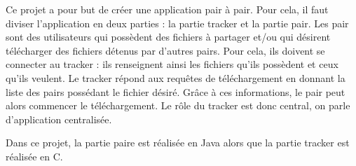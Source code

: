 
Ce projet a pour but de créer une application pair à pair. Pour cela,
il faut diviser l'application en deux parties : la partie tracker et
la partie pair.  Les pair sont des utilisateurs qui possèdent des
fichiers à partager et/ou qui désirent télécharger des fichiers
détenus par d'autres pairs. Pour cela, ils doivent se connecter au
tracker : ils renseignent ainsi les fichiers qu'ils possèdent et ceux
qu'ils veulent. Le tracker répond aux requêtes de téléchargement en
donnant la liste des pairs possédant le fichier désiré. Grâce à ces
informations, le pair peut alors commencer le téléchargement.  Le rôle
du tracker est donc central, on parle d'application centralisée.

Dans ce projet, la partie paire est réalisée en Java alors que la
partie tracker est réalisée en C.

